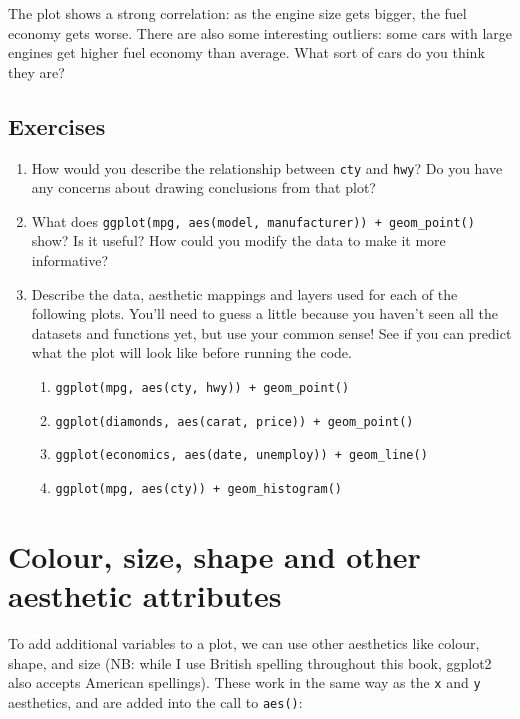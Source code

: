 The plot shows a strong correlation: as the engine size gets bigger, the
fuel economy gets worse. There are also some interesting outliers: some
cars with large engines get higher fuel economy than average. What sort
of cars do you think they are?

\hypertarget{exercises-1}{%
\subsection{Exercises}\label{exercises-1}}

\begin{enumerate}
\def\labelenumi{\arabic{enumi}.}
\item
  How would you describe the relationship between \texttt{cty} and
  \texttt{hwy}? Do you have any concerns about drawing conclusions from
  that plot?
\item
  What does
  \texttt{ggplot(mpg,\ aes(model,\ manufacturer))\ +\ geom\_point()}
  show? Is it useful? How could you modify the data to make it more
  informative?
\item
  Describe the data, aesthetic mappings and layers used for each of the
  following plots. You'll need to guess a little because you haven't
  seen all the datasets and functions yet, but use your common sense!
  See if you can predict what the plot will look like before running the
  code.

  \begin{enumerate}
  \def\labelenumii{\arabic{enumii}.}
  \tightlist
  \item
    \texttt{ggplot(mpg,\ aes(cty,\ hwy))\ +\ geom\_point()}
  \item
    \texttt{ggplot(diamonds,\ aes(carat,\ price))\ +\ geom\_point()}
  \item
    \texttt{ggplot(economics,\ aes(date,\ unemploy))\ +\ geom\_line()}
  \item
    \texttt{ggplot(mpg,\ aes(cty))\ +\ geom\_histogram()}
  \end{enumerate}
\end{enumerate}

\hypertarget{aesthetics}{%
\section{Colour, size, shape and other aesthetic
attributes}\label{aesthetics}}

To add additional variables to a plot, we can use other aesthetics like
colour, shape, and size (NB: while I use British spelling throughout
this book, ggplot2 also accepts American spellings). These work in the
same way as the \texttt{x} and \texttt{y} aesthetics, and are added into
the call to \texttt{aes()}:  

